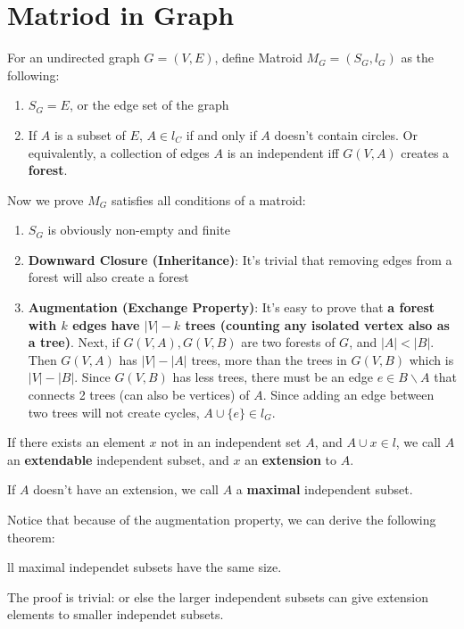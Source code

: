 \documentclass[12pt]{article}
\newenvironment{theorem}[2][Theorem]{\begin{trivlist}
		\item[\hskip \labelsep {\bfseries #1}\hskip \labelsep {\bfseries #2.}]}{\end{trivlist}}
\newenvironment{definition}[2][Definition]{\begin{trivlist}
		\item[\hskip \labelsep {\bfseries #1}\hskip \labelsep {\bfseries #2.}]}{\end{trivlist}}
\begin{document}
	\section{Matriod in Graph}
	For an undirected graph $G = (V, E)$, define Matroid $M_G = (S_G, l_G)$ as the following:
	\begin{enumerate}
		\item $S_G = E$, or the edge set of the graph
		\item If $A$ is a subset of $E$, $A \in l_C$ if and only if $A$ doesn't contain circles. Or equivalently, a collection of edges $A$ is an independent iff $G(V, A)$ creates a \textbf{forest}.
	\end{enumerate}
	Now we prove $M_G$ satisfies all conditions of a matroid:
	\begin{enumerate}
		\item $S_G$ is obviously non-empty and finite
		\item \textbf{Downward Closure (Inheritance)}: It's trivial that removing edges from a forest will also create a forest
		\item \textbf{Augmentation (Exchange Property)}: It's easy to prove that \textbf{a forest with $k$ edges have $|V| - k$ trees (counting any isolated vertex also as a tree)}. Next, if $G(V, A), G(V, B)$ are two forests of $G$, and $|A| < |B|$. Then $G(V, A)$ has $|V| - |A|$ trees, more than the trees in $G(V, B)$ which is $|V| - |B|$. Since $G(V, B)$ has less trees, there must be an edge $e \in B \backslash A$ that connects 2 trees (can also be vertices) of $A$. Since adding an edge between two trees will not create cycles, $A \cup \{e\} \in l_G$.
	\end{enumerate}
	\begin{definition}{1}
		If there exists an element $x$ not in an independent set $A$, and $A \cup {x} \in l$, we call $A$ an \textbf{extendable} independent subset, and $x$ an \textbf{extension} to $A$. 
	\end{definition}
	\begin{definition}{2}
		If $A$ doesn't have an extension, we call $A$ a \textbf{maximal} independent subset.
	\end{definition}
	
	Notice that because of the augmentation property, we can derive the following theorem:
	
	\begin{theorem}
		All maximal independet subsets have the same size.
	\end{theorem}
	The proof is trivial: or else the larger independent subsets can give extension elements to  smaller independet subsets.
	
\end{document}
